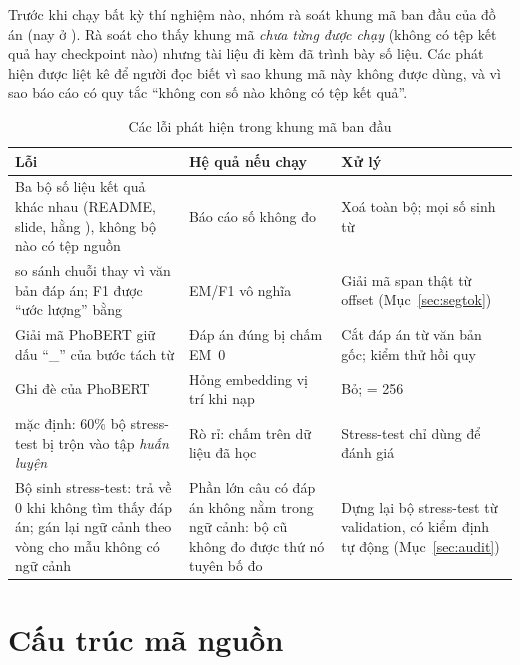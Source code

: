 Trước khi chạy bất kỳ thí nghiệm nào, nhóm rà soát khung mã ban đầu của đồ án (nay ở
). Rà soát cho thấy khung mã \emph{chưa từng được chạy} (không có tệp kết quả
hay checkpoint nào) nhưng tài liệu đi kèm đã trình bày số liệu. Các phát hiện được liệt kê để
người đọc biết vì sao khung mã này không được dùng, và vì sao báo cáo có quy tắc ``không con số
nào không có tệp kết quả''.

\begin{table}[H]
\centering
\caption{Các lỗi phát hiện trong khung mã ban đầu}
\label{tab:legacy}
\renewcommand{\arraystretch}{1.18}
\small
\begin{tabularx}{\textwidth}{@{}L L L@{}}
\toprule
\textbf{Lỗi} & \textbf{Hệ quả nếu chạy} & \textbf{Xử lý} \\
\midrule
Ba bộ số liệu kết quả khác nhau (README, slide, hằng ), không bộ nào có tệp nguồn & Báo cáo số không đo & Xoá toàn bộ; mọi số sinh từ  \\
 so sánh chuỗi  thay vì văn bản đáp án; F1 được ``ước lượng'' bằng  & EM/F1 vô nghĩa & Giải mã span thật từ offset (Mục~\ref{sec:segtok}) \\
Giải mã PhoBERT giữ dấu ``\_'' của bước tách từ & Đáp án đúng bị chấm EM~0 & Cắt đáp án từ văn bản gốc; kiểm thử hồi quy \\
Ghi đè  của PhoBERT & Hỏng embedding vị trí khi nạp & Bỏ;  = 256 \\
 mặc định: 60\% bộ stress-test bị trộn vào tập \emph{huấn luyện} & Rò rỉ: chấm trên dữ liệu đã học & Stress-test chỉ dùng để đánh giá \\
Bộ sinh stress-test:  trả về 0 khi không tìm thấy đáp án;  gán lại ngữ cảnh theo vòng cho mẫu không có ngữ cảnh & Phần lớn câu có đáp án không nằm trong ngữ cảnh: bộ cũ không đo được thứ nó tuyên bố đo & Dựng lại bộ stress-test từ validation, có kiểm định tự động (Mục~\ref{sec:audit}) \\
\bottomrule
\end{tabularx}
\end{table}

\section{Cấu trúc mã nguồn}
\label{app:code}

